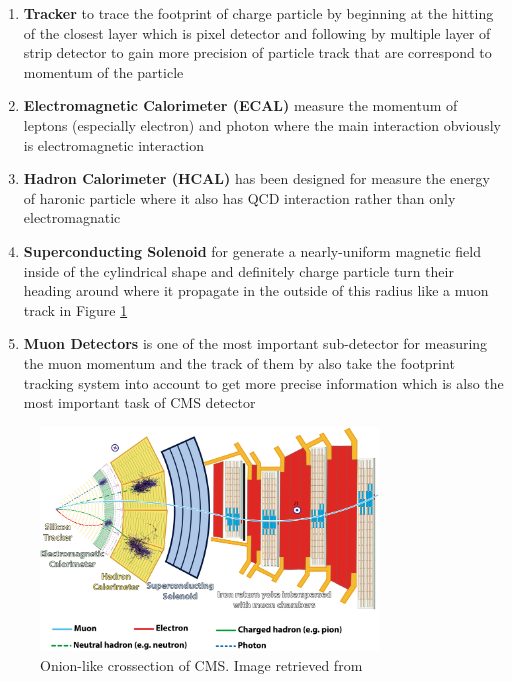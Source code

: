 \begin{enumerate}
    \item \textbf{Tracker} to trace the footprint of charge particle by beginning at the hitting of the closest layer which is pixel detector and following by multiple layer of strip detector to gain more precision of particle track that are correspond to momentum of the particle
    \item \textbf{Electromagnetic Calorimeter (ECAL)} measure the momentum of leptons (especially electron) and photon where the main interaction obviously is electromagnetic interaction
    \item \textbf{Hadron Calorimeter (HCAL)} has been designed for measure the energy of haronic particle where it also has QCD interaction rather than only electromagnatic
    \item \textbf{Superconducting Solenoid} for generate a nearly-uniform magnetic field inside of the cylindrical shape and definitely charge particle turn their heading around where it propagate in the outside of this radius like a muon track in Figure \ref{fig:cms_slide}
    \item \textbf{Muon Detectors} is one of the most important sub-detector for measuring the muon momentum and the track of them by also take the footprint tracking system into account to get more precise information which is also the most important task of CMS detector
\end{enumerate}
\begin{figure}[h!]
    \centering
    \includegraphics[width=0.8\textwidth]{images/cms_slide.png}
    \caption{Onion-like crossection of CMS. Image retrieved from \cite{cms_onion}}
    \label{fig:cms_slide}
\end{figure}



